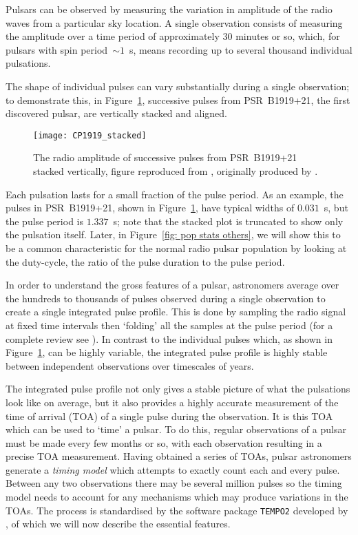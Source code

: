 Pulsars can be observed by measuring the variation in amplitude of the radio
waves from a particular sky location. A single observation consists of
measuring the amplitude over a time period of approximately $30$ minutes or so,
which, for pulsars with spin period~$\sim1$~s, means recording up to several
thousand individual pulsations.

The shape of individual pulses can vary substantially during a single
observation; to demonstrate this, in Figure~\ref{fig: CP1919 stacked},
successive pulses from PSR~B1919+21, the first discovered pulsar, are
vertically stacked and aligned.
\begin{figure}[htb]
\centering
\texttt{[image: CP1919\_stacked]}
\caption{The radio amplitude of successive pulses from PSR~B1919+21 stacked
vertically, figure reproduced from \citet{mitton1977cambridge}, originally
produced by \citet{craft1970}.}
\label{fig: CP1919 stacked}
\end{figure}
Each pulsation lasts for a small fraction of the pulse period. As an example,
the pulses in PSR~B1919+21, shown in Figure~\ref{fig: CP1919 stacked}, have
typical widths of $0.031$~s, but the pulse period is $1.337$~s; note that the
stacked plot is truncated to show only the pulsation itself. Later, in
Figure~\ref{fig: pop stats others}, we will show this to be a common
characteristic for the normal radio pulsar population by looking at the
duty-cycle, the ratio of the pulse duration to the pulse period.

In order to understand the gross features of a pulsar, astronomers average over
the hundreds to thousands of pulses observed during a single observation to
create a single integrated pulse profile. This is done by sampling the radio
signal at fixed time intervals then `folding' all the samples at the pulse
period (for a complete review see \citet{Lyne2012book}). In contrast to the
individual pulses which, as shown in Figure~\ref{fig: CP1919 stacked}, can be
highly variable, the integrated pulse profile is highly stable between
independent observations over timescales of years.

The integrated pulse profile not only gives a stable picture of what the
pulsations look like on average, but it also provides a highly accurate
measurement of the time of arrival (TOA) of a single pulse during the
observation. It is this TOA
which can be used to `time' a pulsar. To do this, regular observations of a
pulsar must be made every few months or so, with each observation resulting in a
precise TOA measurement. Having obtained a series of TOAs, pulsar astronomers
generate a \emph{timing model} which attempts to exactly count each and every
pulse. Between any two observations there may be several million pulses so the
timing model needs to account for any mechanisms which may produce variations
in the TOAs.  The process is standardised by the software package
\texttt{TEMPO2} developed by \citet{Hobbs2006}, of which we will now describe the
essential features.

